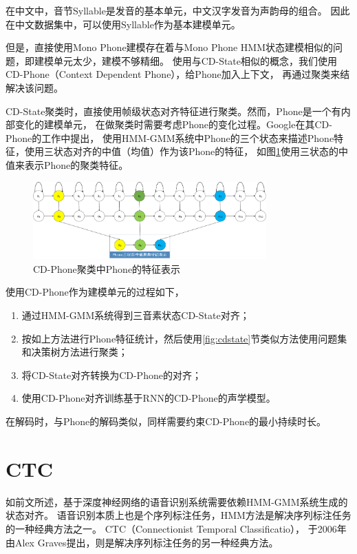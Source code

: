 在中文中，音节Syllable是发音的基本单元，中文汉字发音为声韵母的组合。
因此在中文数据集中，可以使用Syllable作为基本建模单元。

但是，直接使用Mono Phone建模存在着与Mono Phone HMM状态建模相似的问题，即建模单元太少，建模不够精细。
使用与CD-State相似的概念，我们使用CD-Phone（Context Dependent Phone），给Phone加入上下文，
再通过聚类来结解决该问题。

CD-State聚类时，直接使用帧级状态对齐特征进行聚类。然而，Phone是一个有内部变化的建模单元，
在做聚类时需要考虑Phone的变化过程。Google在其CD-Phone的工作中提出，
使用HMM-GMM系统中Phone的三个状态来描述Phone特征，使用三状态对齐的中值（均值）作为该Phone的特征，
如图\ref{fig:3middle}使用三状态的中值来表示Phone的聚类特征。

\begin{figure}[htbp]
\centering
\includegraphics[width=0.8\textwidth]{figures/chapter4/3middle-crop}
\caption{CD-Phone聚类中Phone的特征表示}
\label{fig:3middle}
\end{figure}


使用CD-Phone作为建模单元的过程如下，
\begin{enumerate}
\item 通过HMM-GMM系统得到三音素状态CD-State对齐；
\item 按如上方法进行Phone特征统计，然后使用\ref{fig:cdstate}节类似方法使用问题集和决策树方法进行聚类；
\item 将CD-State对齐转换为CD-Phone的对齐；
\item 使用CD-Phone对齐训练基于RNN的CD-Phone的声学模型。
\end{enumerate}
在解码时，与Phone的解码类似，同样需要约束CD-Phone的最小持续时长。


\section{CTC}

如前文所述，基于深度神经网络的语音识别系统需要依赖HMM-GMM系统生成的状态对齐。
语音识别本质上也是个序列标注任务，HMM方法是解决序列标注任务的一种经典方法之一。
CTC（Connectionist Temporal Classificatio），
于2006年由Alex Graves提出，则是解决序列标注任务的另一种经典方法。

